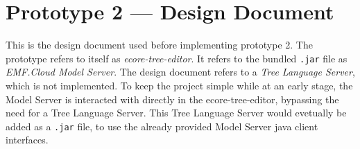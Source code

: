 \chapter{Prototype 2 --- Design Document}\label{app:prototype-2-design-doc}

This is the design document used before implementing prototype 2.
The prototype refers to itself as \emph{ecore-tree-editor}.
It refers to the bundled \texttt{.jar} file as \emph{EMF.Cloud Model Server}.
The design document refers to a \emph{Tree Language Server}, which is not implemented.
To keep the project simple while at an early stage, the Model Server is interacted with directly in the ecore-tree-editor, bypassing the need for a Tree Language Server.
This Tree Language Server would evetually be added as a \texttt{.jar} file, to use the already provided Model Server java client interfaces.

\cleardoublepage
